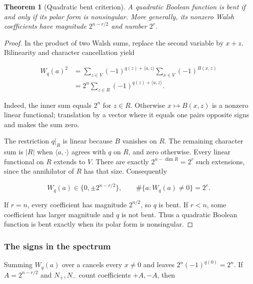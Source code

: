 \documentclass[11pt,a4paper]{article}
\newtheorem{theorem}{Theorem}
\theoremstyle{definition}
\begin{document}
\begin{theorem}[Quadratic bent criterion]\label{thm:walsh}A quadratic Boolean function is bent if and only if its polar form is nonsingular. More generally, its nonzero Walsh coefficients have magnitude $2^{n-r/2}$ and number $2^r$.\end{theorem}\begin{proof}

In the product of two Walsh sums, replace the second variable by $x+z$. Bilinearity and character cancellation yield


\begin{equation}\label{eq:66}
\begin{aligned}W_q(a)^2&=\sum_{z\in V}(-1)^{q(z)+\langle a,z\rangle}\sum_{x\in V}(-1)^{B(x,z)}\\&=2^n\sum_{z\in R}(-1)^{q(z)+\langle a,z\rangle}.\end{aligned}
\end{equation}

Indeed, the inner sum equals $2^{n}$ for $z\in R$. Otherwise $x\mapsto B(x,z)$ is a nonzero linear functional; translation by a vector where it equals one pairs opposite signs and makes the sum zero.


The restriction $q|_{R}$ is linear because $B$ vanishes on $R$. The remaining character sum is $|R|$ when $\langle a,\cdot \rangle $ agrees with $q$ on $R$, and zero otherwise. Every linear functional on $R$ extends to $V$. There are exactly $2^{n-\dim R}=2^{r}$ such extensions, since the annihilator of $R$ has that size. Consequently


\begin{equation}\label{eq:69}
W_q(a)\in\{0,\pm2^{n-r/2}\},\qquad\#\{a:W_q(a)\ne0\}=2^r.
\end{equation}

If $r=n$, every coefficient has magnitude $2^{n/2}$, so $q$ is bent. If $r<n$, some coefficient has larger magnitude and $q$ is not bent. Thus a quadratic Boolean function is bent exactly when its polar form is nonsingular.


\end{proof}

\subsubsection*{The signs in the spectrum}

Summing $W_{q}(a)$ over a cancels every $x\ne 0$ and leaves $2^{n}(-1)^{q(0)}=2^{n}$. If $A=2^{n-r/2}$ and $N_{+},N_{-}$ count coefficients $+A,-A$, then
\end{document}
